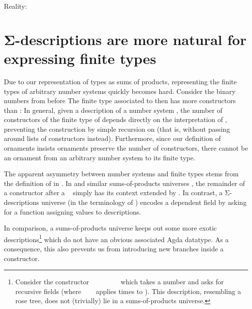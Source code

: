 Reality:
\section{Σ-descriptions are more natural for expressing finite types}\label{sec:closed-universe}
Due to our representation of types as sums of products, representing the finite types of arbitrary number systems quickly becomes hard. Consider the binary numbers from before
The finite type associated to  then has more constructors than :
In general, given a description of a number system , the number of constructors of the finite type  of  depends directly on the interpretation of , preventing the construction  by simple recursion on  (that is, without passing around lists of constructors instead). Furthermore, since our definition of ornaments insists ornaments preserve the number of constructors, there cannot be an ornament from an arbitrary number system to its finite type. 

The apparent asymmetry between number systems and finite types stems from the definition of  in . In  and similar sums-of-products universes \cite{practgen,sijsling}, the remainder of a constructor  after a \  simply has its context extended by . In contrast, a Σ-descriptions universe \cite{effectfully,progorn,algorn} (in the terminology of \cite{sijsling}) encodes a dependent field  by asking for a function  assigning values  to descriptions. 

In comparison, a sums-of-products universe keeps out some more exotic descriptions\footnote{Consider the constructor \ \bN{}\ \ \ \ \ \ \  which takes a number  and asks for  recursive fields (where \ \ \  applies   times to ). This description, resembling a rose tree, does not (trivially) lie in a sums-of-products universe.} which do not have an obvious associated Agda datatype. As a consequence, this also prevents us from introducing new branches inside a constructor.

